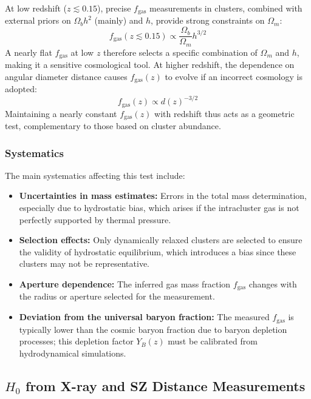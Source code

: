 \smallskip

At low redshift ($z \lesssim 0.15$), precise $f_{\text{gas}}$ measurements in clusters, combined with external priors on $\Omega_b h^2$ (mainly) and $h$, provide strong constraints on $\Omega_m$:
$$
f_{\text{gas}}(z \lesssim 0.15) \propto \frac{\Omega_b}{\Omega_m} h^{3/2}
$$
A nearly flat $f_{\text{gas}}$ at low $z$ therefore selects a specific combination of $\Omega_m$ and $h$, making it a sensitive cosmological tool. At higher redshift, the dependence on angular diameter distance causes $f_{\text{gas}}(z)$ to evolve if an incorrect cosmology is adopted:
$$
f_{\text{gas}}(z) \propto d(z)^{-3/2}
$$
Maintaining a nearly constant $f_{\text{gas}}(z)$ with redshift thus acts as a geometric test, complementary to those based on cluster abundance.

\subsubsection{Systematics}

The main systematics affecting this test include:
\begin{itemize}
    \item \textbf{Uncertainties in mass estimates:} Errors in the total mass determination, especially due to hydrostatic bias, which arises if the intracluster gas is not perfectly supported by thermal pressure.
    \item \textbf{Selection effects:} Only dynamically relaxed clusters are selected to ensure the validity of hydrostatic equilibrium, which introduces a bias since these clusters may not be representative.
    \item \textbf{Aperture dependence:} The inferred gas mass fraction $f_{\mathrm{gas}}$ changes with the radius or aperture selected for the measurement.
    \item \textbf{Deviation from the universal baryon fraction:} The measured $f_{\mathrm{gas}}$ is typically lower than the cosmic baryon fraction due to baryon depletion processes; this depletion factor $Y_B(z)$ must be calibrated from hydrodynamical simulations.
\end{itemize}

\newpage
\subsection{$H_0$ from X-ray and SZ Distance Measurements} \label{subsec:h0_xsz}

